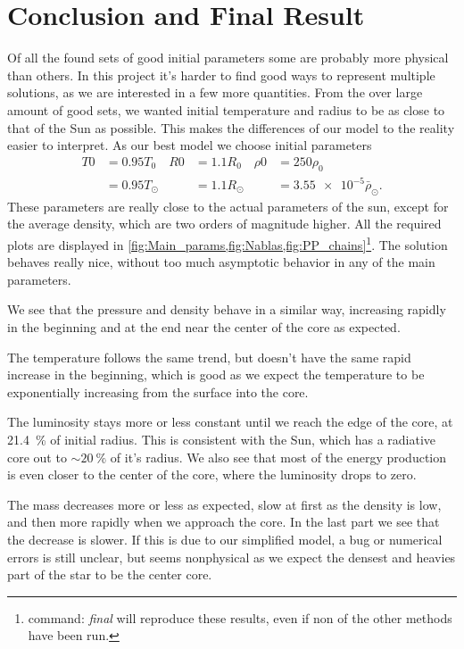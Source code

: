 \documentclass[11pt,a4paper,twocolumn,titlepage]{article}
\begin{document}
\section{Conclusion and Final Result}\label{sec:Conclusion}
Of all the found sets of good initial parameters some are probably more physical than others. In this project it's harder to find good ways to represent multiple solutions, as we are interested in a few more quantities. From the over large amount of good sets, we wanted initial temperature and radius to be as close to that of the Sun as possible. This makes the differences of our model to the reality easier to interpret. As our best model we choose initial parameters
\begin{align*}
T0 &= 0.95 T_0 & R0 &= 1.1 R_0 & \rho 0 &= 250 \rho_0
\\
&= 0.95  T_\odot & &= 1.1 R_\odot & &= \num{3.55e-5} \bar{\rho}_\odot.
\end{align*}
These parameters are really close to the actual parameters of the sun, except for the average density, which are two orders of magnitude higher. All the required plots are displayed in \cref{fig:Main_params,fig:Nablas,fig:PP_chains}\footnote{command: \textit{final} will reproduce these results, even if non of the other methods have been run.}. The solution behaves really nice, without too much asymptotic behavior in any of the main parameters. 

We see that the pressure and density behave in a similar way, increasing rapidly in the beginning and at the end near the center of the core as expected.

The temperature follows the same trend, but doesn't have the same rapid increase in the beginning, which is good as we expect the temperature to be exponentially increasing from the surface into the core. 

The luminosity stays more or less constant until we reach the edge of the core, at \SI{21.4}{\percent} of initial radius. This is consistent with the Sun, which has a radiative core out to $\sim \SI{20}{\percent}$ of it's radius\citep{Actual_sun}. We also see that most of the energy production is even closer to the center of the core, where the luminosity drops to zero.

The mass decreases more or less as expected, slow at first as the density is low, and then more rapidly when we approach the core. In the last part we see that the decrease is slower. If this is due to our simplified model, a bug or numerical errors is still unclear, but seems nonphysical as we expect the densest and heavies part of the star to be the center core. 
\end{document}
